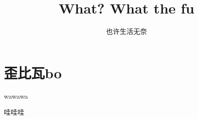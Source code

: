 \documentclass{article}
\begin{document}
\title{What? What the fu}
\author[]{也许生活无奈}
\date{}
\maketitle

\section{歪比瓦bo}\label{intro}

wawawa

哇哇哇
\end{document}

